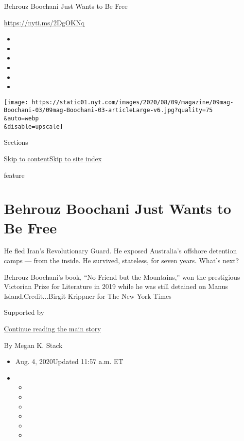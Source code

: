 Behrouz Boochani Just Wants to Be Free

\url{https://nyti.ms/2DgOKNq}

\begin{itemize}
\item
\item
\item
\item
\item
\item
\end{itemize}

\texttt{[image: https://static01.nyt.com/images/2020/08/09/magazine/09mag-Boochani-03/09mag-Boochani-03-articleLarge-v6.jpg?quality=75\\\&auto=webp\\\&disable=upscale]}

Sections

\protect\hyperlink{site-content}{Skip to
content}\protect\hyperlink{site-index}{Skip to site index}

feature

\hypertarget{behrouz-boochani-just-wants-to-be-free}{%
\section{Behrouz Boochani Just Wants to Be
Free}\label{behrouz-boochani-just-wants-to-be-free}}

He fled Iran's Revolutionary Guard. He exposed Australia's offshore
detention camps --- from the inside. He survived, stateless, for seven
years. What's next?

Behrouz Boochani's book, ``No Friend but the Mountains,'' won the
prestigious Victorian Prize for Literature in 2019 while he was still
detained on Manus Island.Credit...Birgit Krippner for The New York Times

Supported by

\protect\hyperlink{after-sponsor}{Continue reading the main story}

By Megan K. Stack

\begin{itemize}
\item
  Aug. 4, 2020Updated 11:57 a.m. ET
\item
  \begin{itemize}
  \item
  \item
  \item
  \item
  \item
  \item
  \end{itemize}
\end{itemize}

